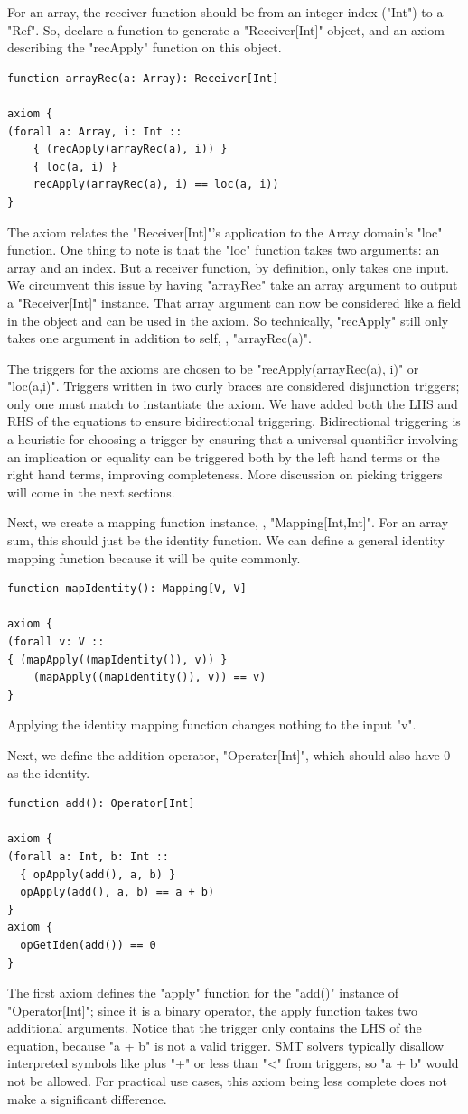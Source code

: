 \documentclass[msc,oneside]{ubcthesis}
\begin{document}
For an array, the receiver function should be from an integer index ("Int") to a "Ref". So, declare a function to generate a "Receiver[Int]" object, and an axiom describing the "recApply" function on this object.
\begin{lstlisting}
function arrayRec(a: Array): Receiver[Int] 

axiom {
(forall a: Array, i: Int ::
    { (recApply(arrayRec(a), i)) }
    { loc(a, i) }
    recApply(arrayRec(a), i) == loc(a, i))
}
\end{lstlisting}
The axiom relates the "Receiver[Int]"'s application to the Array domain's "loc" function. One thing to note is that the "loc" function takes two arguments: an array and an index. But a receiver function, by definition, only takes one input. We circumvent this issue by having "arrayRec" take an array argument to output a "Receiver[Int]" instance. That array argument can now be considered like a field in the object and can be used in the axiom. So technically, "recApply" still only takes one argument in addition to self, \ie, "arrayRec(a)".

The triggers for the axioms are chosen to be "recApply(arrayRec(a), i)" or "loc(a,i)". Triggers written in two curly braces are considered disjunction triggers; only one must match to instantiate the axiom. We have added both the LHS and RHS of the equations to ensure bidirectional triggering. Bidirectional triggering is a heuristic for choosing a trigger by ensuring that a universal quantifier involving an implication or equality can be triggered both by the left hand terms or the right hand terms, improving completeness. More discussion on picking triggers will come in the next sections.

Next, we create a mapping function instance, \ie, "Mapping[Int,Int]". For an array sum, this should just be the identity function. We can define a general identity mapping function because it will be quite commonly.
\begin{lstlisting}
function mapIdentity(): Mapping[V, V] 
  
axiom {
(forall v: V ::
{ (mapApply((mapIdentity()), v)) }
    (mapApply((mapIdentity()), v)) == v)
}
\end{lstlisting}
Applying the identity mapping function changes nothing to the input "v".

Next, we define the addition operator, "Operater[Int]", which should also have 0 as the identity.
\begin{lstlisting}
function add(): Operator[Int] 
  
axiom {
(forall a: Int, b: Int ::
  { opApply(add(), a, b) }
  opApply(add(), a, b) == a + b)
}
axiom {
  opGetIden(add()) == 0
}
\end{lstlisting}
The first axiom defines the "apply" function for the "add()" instance of "Operator[Int]"; since it is a binary operator, the apply function takes two additional arguments. Notice that the trigger only contains the LHS of the equation, because "a + b" is not a valid trigger. SMT solvers typically disallow interpreted symbols like plus "+" or less than "<" from triggers, so "a + b" would not be allowed. For practical use cases, this axiom being less complete does not make a significant difference.
\end{document}
